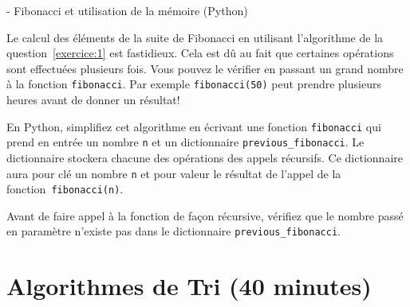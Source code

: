 \begin{Exercice}[15 minutes] - Fibonacci et utilisation de la mémoire (Python)

Le calcul des éléments de la suite de Fibonacci en utilisant l'algorithme de la question~\ref{exercice:1} est fastidieux. Cela est dû au fait que certaines opérations sont effectuées plusieurs fois. Vous pouvez le vérifier en passant un grand nombre à la fonction \lstinline{fibonacci}. Par exemple \lstinline{fibonacci(50)} peut prendre plusieurs heures avant de donner un résultat!

En Python, simplifiez cet algorithme en écrivant une fonction \lstinline{fibonacci} qui prend en entrée un nombre \lstinline{n} et un dictionnaire \lstinline{previous_fibonacci}. Le dictionnaire stockera chacune des opérations des appels récursifs. Ce dictionnaire aura pour clé un nombre \lstinline{n} et pour valeur le résultat de l'appel de la fonction~\lstinline{fibonacci(n)}. 

Avant de faire appel à la fonction de façon récursive, vérifiez que le nombre passé en paramètre n'existe pas dans le dictionnaire \lstinline{previous_fibonacci}.


\begin{solution}
     
\end{solution}

\end{Exercice}

\section{Algorithmes de Tri (40 minutes)}

